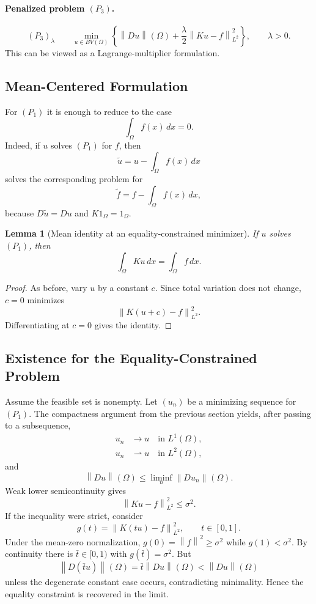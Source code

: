 \documentclass[11pt]{article}
\newcommand{\Om}{\Omega}
\newcommand{\norm}[2][]{\left\lVert #2\right\rVert_{#1}}
\theoremstyle{definition}
\theoremstyle{plain}
\newtheorem{lemma}[definition]{Lemma}
\begin{document}
\paragraph{Penalized problem $(P_3)$.}
\[
(P_3)_\lambda\qquad
\min_{u\in BV(\Om)}
\left\{
\norm{Du}(\Om)+\frac{\lambda}{2}\norm[L^2]{Ku-f}^2
\right\},
\qquad \lambda>0.
\]
This can be viewed as a Lagrange-multiplier formulation.

\subsection{Mean-Centered Formulation}
For $(P_1)$ it is enough to reduce to the case
\[
\int_{\Om}f(x)\,dx=0.
\]
Indeed, if $u$ solves $(P_1)$ for $f$, then
\[
\widetilde u=u-\int_{\Om}f(x)\,dx
\]
solves the corresponding problem for
\[
\widetilde f=f-\int_{\Om}f(x)\,dx,
\]
because $D\widetilde u=Du$ and $K1_{\Om}=1_{\Om}$.

\begin{lemma}[Mean identity at an equality-constrained minimizer]
If $u$ solves $(P_1)$, then
\[
\int_{\Om}Ku\,dx=\int_{\Om}f\,dx.
\]
\end{lemma}

\begin{proof}
As before, vary $u$ by a constant $c$. Since total variation does not change, $c=0$ minimizes
\[
\norm[L^2]{K(u+c)-f}^2.
\]
Differentiating at $c=0$ gives the identity.
\end{proof}

\subsection{Existence for the Equality-Constrained Problem}
Assume the feasible set is nonempty. Let $(u_n)$ be a minimizing sequence for $(P_1)$. The compactness argument from the previous section yields, after passing to a subsequence,
\begin{align*}
u_n &\to u\quad\text{in }L^1(\Om),\\
u_n &\rightharpoonup u\quad\text{in }L^2(\Om),
\end{align*}
and
\[
\norm{Du}(\Om)\le\liminf_n\norm{Du_n}(\Om).
\]
Weak lower semicontinuity gives
\[
\norm[L^2]{Ku-f}^2\le\sigma^2.
\]
If the inequality were strict, consider
\[
g(t)=\norm[L^2]{K(tu)-f}^2,
\qquad t\in[0,1].
\]
Under the mean-zero normalization, $g(0)=\norm{f}^2\ge\sigma^2$ while $g(1)<\sigma^2$. By continuity there is $\bar t\in[0,1)$ with $g(\bar t)=\sigma^2$. But
\[
\norm{D(\bar t u)}(\Om)=\bar t\norm{Du}(\Om)<\norm{Du}(\Om)
\]
unless the degenerate constant case occurs, contradicting minimality. Hence the equality constraint is recovered in the limit.
\end{document}
